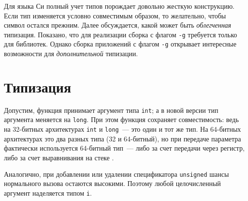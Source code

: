 \documentclass[russian,a4paper,12pt]{article}
\begin{document}
Для языка Си полный учет типов порождает довольно жесткую конструкцию.  Если тип
изменяется условно совместимым образом, то желательно, чтобы символ остался прежним.
Далее обсуждается, какой может быть \textit{облегченная} типизация.  Показано,
что для реализации сборка с флагом \verb|-g| требуется только для библиотек.
Однако сборка приложений с флагом \verb|-g| открывает интересные возможности
для \textit{дополнительной} типизации.

\section{Типизация}
Допустим, функция принимает аргумент типа \verb|int|; а в новой версии тип аргумента
меняется на \verb|long|.  При этом функция сохраняет совместимость: ведь на 32-битных
архитектурах \verb|int| и \verb|long|~--- это один и тот же тип.  На 64-битных архитектурах
это два разных типа (32 и 64-битный), но при передаче параметра фактически используется
64-битный тип~--- либо за счет передачи через регистр, либо за счет выравнивания на стеке
\cite[с.\,23]{AMD64ABI}.
\begin{comment}
При этом возникает хороший вопрос: а не будет у нас мусора в старших битах?
По крайней мере на x86-64 мусора не появляется, потому что "mov eax" автоматически
очищает старшие биты.  Проверим, насколько серьезна проблема мусора в других случаях:
\begin{verbatim}
$ cat lib.c
#include <stdio.h>
void func(LIB_TYPE arg) { printf("%ld\n", (long) arg); }
$ cat main.c
extern void func(MAIN_TYPE arg);
int main() { func(666); return 0; }
$ gcc -m32 -DMAIN_TYPE=short -DLIB_TYPE=int -O main.c lib.c && ./a.out
666
\end{verbatim}
Вроде нету мусора.
\end{comment}
Аналогично, при добавлении или удалении спецификатора \verb|unsigned|
шансы нормального вызова остаются высокими.  Поэтому любой целочисленный
аргумент наделяется типом \verb|i|.
\end{document}
